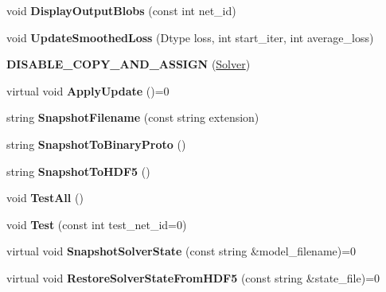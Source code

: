 \begin{DoxyCompactItemize}
void {\bfseries Display\+Output\+Blobs} (const int net\+\_\+id)
\item 
\mbox{\label{classcaffe_1_1_solver_af38477c3d0e124de6eb989629cc4f62f}} 
void {\bfseries Update\+Smoothed\+Loss} (Dtype loss, int start\+\_\+iter, int average\+\_\+loss)
\item 
\mbox{\label{classcaffe_1_1_solver_a3d7a623b6aa51f7971942d376652924f}} 
{\bfseries D\+I\+S\+A\+B\+L\+E\+\_\+\+C\+O\+P\+Y\+\_\+\+A\+N\+D\+\_\+\+A\+S\+S\+I\+GN} (\mbox{\hyperlink{classcaffe_1_1_solver}{Solver}})
\item 
\mbox{\label{classcaffe_1_1_solver_a798f08452f76d3c328e95fa0acdb2b4d}} 
virtual void {\bfseries Apply\+Update} ()=0
\item 
\mbox{\label{classcaffe_1_1_solver_aa05c6b201186bf8425c7b3cdd173daa8}} 
string {\bfseries Snapshot\+Filename} (const string extension)
\item 
\mbox{\label{classcaffe_1_1_solver_ad80ddf6a4dee3706ea91be22bcb1273a}} 
string {\bfseries Snapshot\+To\+Binary\+Proto} ()
\item 
\mbox{\label{classcaffe_1_1_solver_ab6640d8667ba3cb6e492c83c8f8943fc}} 
string {\bfseries Snapshot\+To\+H\+D\+F5} ()
\item 
\mbox{\label{classcaffe_1_1_solver_ac952acb7d33593bac88173ec31481647}} 
void {\bfseries Test\+All} ()
\item 
\mbox{\label{classcaffe_1_1_solver_a9364674374a00fa60cfa7627cce99894}} 
void {\bfseries Test} (const int test\+\_\+net\+\_\+id=0)
\item 
\mbox{\label{classcaffe_1_1_solver_a521bf1546c71c27bec8e33c91eebdfe9}} 
virtual void {\bfseries Snapshot\+Solver\+State} (const string \&model\+\_\+filename)=0
\item 
\mbox{\label{classcaffe_1_1_solver_ae9d89820d020a5f26460183d7f67009e}} 
virtual void {\bfseries Restore\+Solver\+State\+From\+H\+D\+F5} (const string \&state\+\_\+file)=0

\end{DoxyCompactItemize}
